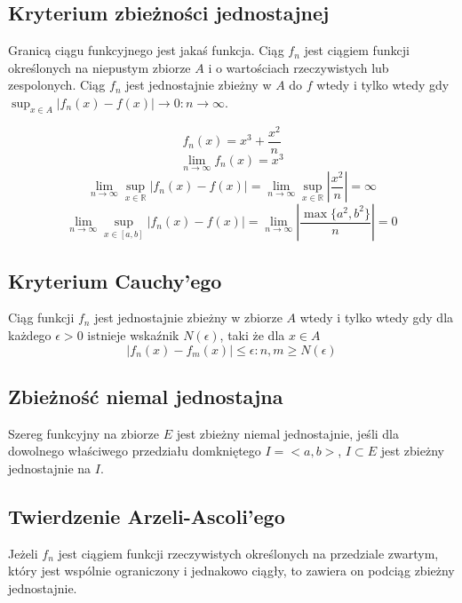 \documentclass{../notatki}
\begin{document}
\subsection{Kryterium zbieżności jednostajnej}

Granicą ciągu funkcyjnego jest jakaś funkcja. Ciąg $f_n$ jest ciągiem funkcji
określonych na niepustym zbiorze $A$ i o wartościach rzeczywistych lub
zespolonych. Ciąg $f_n$ jest jednostajnie zbieżny w $A$ do $f$ wtedy i tylko
wtedy gdy $\sup_{x \in A} |f_n(x) - f(x)| \to 0: n \to \infty$.

$$
f_n(x) = x^3 + \frac{x^2}{n}
$$
$$
\lim_{n \to \infty} f_n(x) = x^3
$$
$$
\lim_{n \to \infty} \sup_{x \in \mathbb{R}} |f_n(x) - f(x)| = \lim_{n
\to \infty} \sup_{x \in \mathbb{R}} | \frac{x^2}{n}| = \infty
$$
$$
\lim_{n \to \infty} \sup_{x \in [a, b]} |f_n(x) - f(x)| = \lim_{n \to
\infty} |\frac{\max \{a^2, b^2\}}{n}| = 0
$$

\subsection{Kryterium Cauchy'ego}

Ciąg funkcji $f_n$ jest jednostajnie zbieżny w zbiorze $A$ wtedy i tylko wtedy
gdy dla każdego $\epsilon > 0$ istnieje wskaźnik $N(\epsilon)$, taki że dla
$x \in A$
$$
|f_n(x) - f_m(x)| \le \epsilon : n,m \ge N(\epsilon)
$$

\subsection{Zbieżność niemal jednostajna}

Szereg funkcyjny na zbiorze $E$ jest zbieżny niemal jednostajnie, jeśli dla
dowolnego właściwego przedziału domkniętego $I = <a, b>$, $I \subset E$ jest
zbieżny jednostajnie na $I$.

\subsection{Twierdzenie Arzeli-Ascoli'ego}

Jeżeli $f_n$ jest ciągiem funkcji rzeczywistych określonych na przedziale
zwartym, który jest wspólnie ograniczony i jednakowo ciągły, to zawiera
on podciąg zbieżny jednostajnie.

\end{document}
